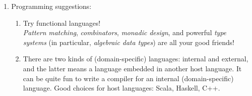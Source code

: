 \documentclass{article}
\begin{document}
\begin{enumerate}
    \item Programming suggestions:
    \begin{enumerate}
        \item Try functional languages!\\
        \emph{Pattern matching}, \emph{combinators}, \emph{monadic design}, and powerful \emph{type systems} (in particular, \emph{algebraic data types}) are all your good friends!
        \item There are two kinds of (domain-specific) languages: internal and external, and the latter means a language embedded in another host language.
        It can be quite fun to write a compiler for an internal (domain-specific) language.
        Good choices for host languages: Scala, Haskell, C++.
    \end{enumerate}


\end{enumerate}
\end{document}
